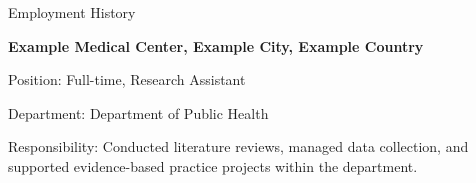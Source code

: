 \begin{rubric}{Employment History}

\entry*[2023 -- present]%
	\textbf{Example Medical Center, Example City, Example Country}
    \par Position: Full-time, Research Assistant
    \par Department: Department of Public Health
    \par Responsibility: Conducted literature reviews, managed data collection, and supported evidence-based practice projects within the department.
%
\end{rubric}
